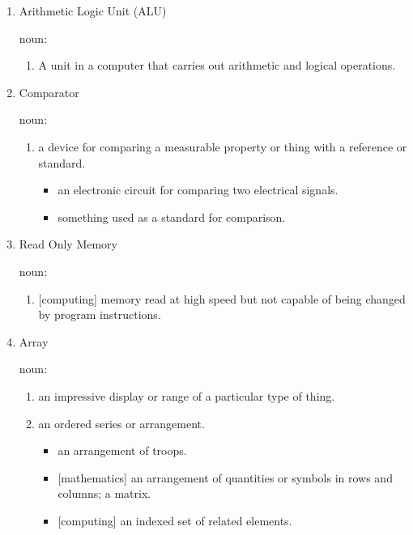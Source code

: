 \documentclass[12pt]{article}
\begin{document}
\begin{enumerate}
  \item Arithmetic Logic Unit (ALU)

  noun:

  \begin{enumerate}
    \item A unit in a computer that carries out arithmetic and logical operations.
  \end{enumerate}

  \item Comparator

  noun:

  \begin{enumerate}
    \item a device for comparing a measurable property or thing with a reference or standard.

    \begin{itemize}
      \item an electronic circuit for comparing two electrical signals.
      \item something used as a standard for comparison.
    \end{itemize}
  \end{enumerate}

  \item{Read Only Memory}

  noun:

  \begin{enumerate}
    \item {[computing]} memory read at high speed but not capable of being changed by program instructions.
  \end{enumerate}

  \item{Array}

  noun:

  \begin{enumerate}
    \item an impressive display or range of a particular type of thing.

    \item an ordered series or arrangement.
      \begin{itemize}
        \item an arrangement of troops.
        \item {[mathematics]} an arrangement of quantities or symbols in rows and columns; a matrix.
        \item {[computing]} an indexed set of related elements.
      \end{itemize}


\end{enumerate}
\end{enumerate}
\end{document}
